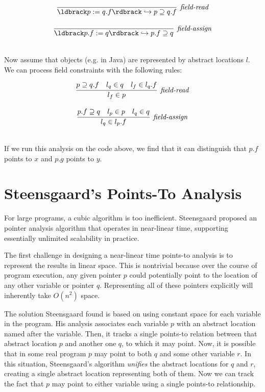 \documentclass[11pt]{article}
\newcommand{\parg}[1] %
  {\ldbrack #1 \rdbrack}
\begin{document}
\begin{sloppypar}
\[
\begin{array}{c}
\infer[\textit{field-read}]
	{\parg{p := q.f} \hookrightarrow p \supseteq q.f}
	{}\\[3ex]
	
\infer[\textit{field-assign}]
	{\parg{p.f := q} \hookrightarrow p.f \supseteq q}
	{}\\[3ex]
	
\end{array}
\]


Now assume that objects (e.g. in Java) are represented by abstract locations $l$.  We can process field constraints with the following rules:

\[
\begin{array}{c}
\infer[\textit{field-read}]
	{l_f \in p}
	{p \supseteq q.f & l_q \in q & l_f \in l_q.f}\\[3ex]
	
\infer[\textit{field-assign}]
	{l_q \in l_p.f}
	{p.f \supseteq q & l_p \in p & l_q \in q}\\[3ex]
	
\end{array}
\]

If we run this analysis on the code above, we find that it can distinguish that $p.f$ points to $x$ and $p.g$ points to $y$.


\section{Steensgaard's Points-To Analysis}

For large programs, a cubic algorithm is too inefficient.  Steensgaard proposed an pointer analysis algorithm that operates in near-linear time, supporting essentially unlimited scalability in practice.

The first challenge in designing a near-linear time points-to analysis is to represent the results in linear space.  This is nontrivial because over the course of program execution, any given pointer $p$ could potentially point to the location of any other variable or pointer $q$.  Representing all of these pointers explicitly will inherently take $O(n^2)$ space.

The solution Steensgaard found is based on using constant space for each variable in the program.  His analysis associates each variable $p$ with an abstract location named after the variable.  Then, it tracks a single points-to relation between that abstract location $p$ and another one $q$, to which it may point.  Now, it is possible that in some real program $p$ may point to both $q$ and some other variable $r$.  In this situation, Steensgaard's algorithm \textit{unifies} the abstract locations for $q$ and $r$, creating a single abstract location representing both of them.  Now we can track the fact that $p$ may point to either variable using a single points-to relationship.


\end{sloppypar}
\end{document}
